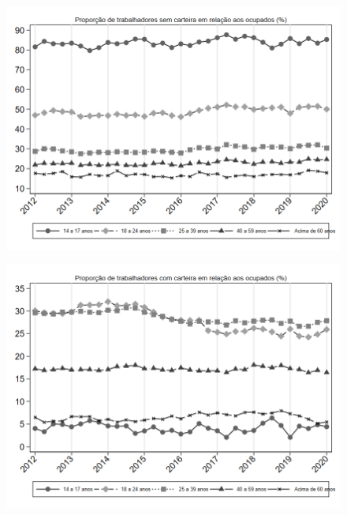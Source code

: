 \begin{frame}[label=_composicao_demografica_faixa_etaria_prop_empregadoSC]{}
\textit{\hyperlink{_composicao_demografica_faixa_etaria}{}}
\begin{figure}
  \centering
  \includegraphics[width=1.0\linewidth]{../../analysis/output/composicao_demografica/faixa_etaria/_composicao_demografica_faixa_etaria_prop_empregadoSC.png}
  \caption{}
  \label{fig:_composicao_demografica_faixa_etaria_prop_empregadoSC}
\end{figure}
\end{frame}

\begin{frame}[label=_composicao_demografica_faixa_etaria_prop_empregadoCC]{}
\textit{\hyperlink{_composicao_demografica_faixa_etaria}{}}
\begin{figure}
  \centering
  \includegraphics[width=1.0\linewidth]{../../analysis/output/composicao_demografica/faixa_etaria/_composicao_demografica_faixa_etaria_prop_empregadoCC.png}
  \caption{}
  \label{fig:_composicao_demografica_faixa_etaria_prop_empregadoCC}
\end{figure}
\end{frame}

